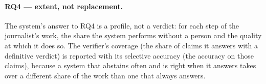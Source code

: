 \paragraph{RQ4 --- extent, not replacement.}
The system's answer to RQ4 is a profile, not a verdict: for each step
of the journalist's work, the share the system performs without a
person and the quality at which it does so. The verifier's coverage
(the share of claims it answers with a definitive verdict) is
reported with its selective accuracy (the accuracy on those claims),
because a system that abstains often and is right when it answers
takes over a different share of the work than one that always
answers.
